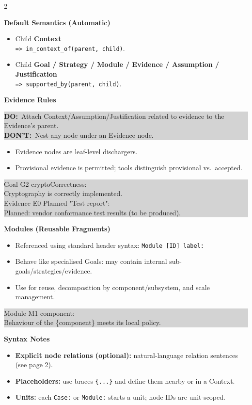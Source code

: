 \documentclass[10pt,letterpaper]{article}
\newcommand{\Sec}[1]{%
  \vspace{5pt}%
  \noindent{\color{RuleGray}\rule{\linewidth}{0.35pt}}\par
  \vspace{2pt}%
  {\bfseries #1}\par
  \vspace{2pt}%
}
\newcommand{\Example}[1]{%
  \vspace{1pt}%
  \noindent\colorbox{LightGray}{%
    \parbox{\linewidth}{\ttfamily\footnotesize\raggedright
#1
    }%
  }%
  \vspace{2pt}%
}
\newcommand{\DoDont}[2]{%
  \vspace{1pt}%
  \noindent\colorbox{LightGray}{%
    \parbox{\linewidth}{\small\textbf{DO:}~#1\hfill \textbf{DON'T:}~#2}%
  }%
  \vspace{2pt}%
}
\begin{document}
\begin{multicols*}{2}
\Sec{Default Semantics (Automatic)}
\begin{itemize}
  \item Child \textbf{Context} \\
        \texttt{=> in\_context\_of(parent, child)}.
  \item Child \textbf{Goal / Strategy / Module / Evidence / Assumption / Justification} \\
        \texttt{=> supported\_by(parent, child)}.
\end{itemize}
\vspace{-6pt}


\Sec{Evidence Rules}
\DoDont{Attach Context/Assumption/Justification related to evidence to the Evidence's parent.\\}{Nest any node under an Evidence node.}
\begin{itemize}
  \item Evidence nodes are leaf-level dischargers.
  \item Provisional evidence is permitted; tools distinguish provisional vs.\ accepted.
\end{itemize}
\Example{Goal G2 cryptoCorrectness:\\
\hspace*{1.5em}Cryptography is correctly implemented.\\
\hspace*{1.5em}Evidence E0 Planned "Test report":\\
\hspace*{3.0em}Planned: vendor conformance test results (to be produced).}

\Sec{Modules (Reusable Fragments)}
\begin{itemize}
  \item Referenced using standard header syntax: \texttt{Module [ID] label:}
  \item Behave like specialised Goals: may contain internal sub-goals/strategies/evidence.
  \item Use for reuse, decomposition by component/subsystem, and scale management.
\end{itemize}
\Example{Module M1 component:\\
\hspace*{1.5em}Behaviour of the \{component\} meets its local policy.}

\Sec{Syntax Notes}
\begin{itemize}
  \item \textbf{Explicit node relations (optional):} natural-language relation sentences (see page 2).
  \item \textbf{Placeholders:} use braces \texttt{\{...\}} and define them nearby or in a Context.
  \item \textbf{Units:} each \texttt{Case:} or \texttt{Module:} starts a unit; node IDs are unit-scoped.
\end{itemize}

\end{multicols*}
\end{document}
